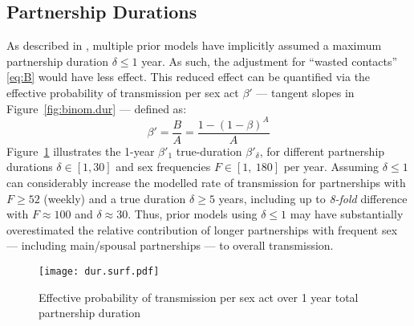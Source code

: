 \subsection{Partnership Durations}\label{foi.exp.dur}
As described in , multiple prior models have
implicitly assumed a maximum partnership duration $\delta \le 1$ year.
As such, the adjustment for ``wasted contacts'' \eqref{eq:B} would have less effect.
This reduced effect can be quantified via
the effective probability of transmission per sex act $\beta'$
--- \ie tangent slopes in Figure~\ref{fig:binom.dur} --- defined as:
\begin{equation}\label{eq:beta.eff}
  \beta' = \frac{B}{A} = \frac{1 - {(1 - \beta)}^{A}}{A}
\end{equation}
Figure~\ref{fig:dur.surf} illustrates the 1-year $\beta'_1$ \vs true-duration $\beta'_\delta$, for
different partnership durations $\delta \in [1, 30]$ and sex frequencies $F \in [1,~180]$ per year.
Assuming $\delta \le 1$ can considerably increase the modelled rate of transmission
for partnerships with $F \ge 52$ (\ie weekly) and a true duration $\delta \ge 5$ years,
including up to \emph{8-fold} difference with $F \approx 100$ and $\delta \approx 30$.
Thus, prior models using $\delta \le 1$ may have
substantially overestimated the relative contribution of
longer partnerships with frequent sex --- including main/spousal partnerships ---
to overall transmission.
\begin{figure}
  \centering\texttt{[image: dur.surf.pdf]}
  \caption{Effective probability of transmission per sex act
    over 1 year \vs total partnership duration}
  \label{fig:dur.surf}
\end{figure}
\clearpage %
